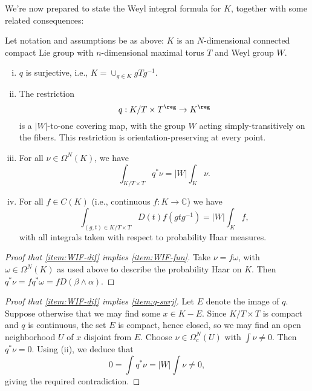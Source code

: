 \documentclass[reqno]{amsart} 
\begin{document}
We're now prepared to state the Weyl integral formula for $K$, together with some related consequences:
\begin{theorem}\label{thm:WIF-general}
  Let notation and assumptions be as above: $K$ is an $N$-dimensional connected compact Lie group with $n$-dimensional maximal torus $T$ and Weyl group $W$.
  \begin{enumerate}
[(i)]
  \item\label{item:q-surj} $q$ is surjective, i.e., $K = \cup_{g \in K} g T g^{-1}$.
  \item\label{item:q-cover} The restriction
    \begin{equation*}
      q : K/T \times T^{\reg} \rightarrow K^{\reg}
    \end{equation*}
    is a $|W|$-to-one covering map, with the group $W$ acting simply-transitively on the fibers.  This restriction is orientation-preserving at every point.
  \item\label{item:WIF-dif} For all $\nu \in \Omega^N(K)$, we have
    \begin{equation}\label{eq:WIF-dif}
      \int_{K /T \times T}
      q^* \nu = |W| \int_K \nu.
    \end{equation}
  \item\label{item:WIF-fun} For all $f \in C(K)$ (i.e., continuous $f : K \rightarrow \mathbb{C}$) we have
    \begin{equation*}
      \int_{(g,t) \in K/T \times T} D(t) f(g t g^{-1}) = |W| \int_K f,
    \end{equation*}
    with all integrals taken with respect to probability Haar measures.
  \end{enumerate}
\end{theorem}
\begin{proof}
[Proof that \ref{item:WIF-dif} implies \ref{item:WIF-fun}]
  Take $\nu = f \omega$, with $\omega \in \Omega^N(K)$ as used above to describe the probability Haar on $K$.  Then $q^* \nu = f q^* \omega = f D (\beta \wedge \alpha)$.
\end{proof}
\begin{proof}
[Proof that \ref{item:WIF-dif} implies \ref{item:q-surj}]
  Let $E$ denote the image of $q$.  Suppose otherwise that we may find some $x \in K - E$.  Since $K/T \times T$ is compact and $q$ is continuous, the set $E$ is compact, hence closed, so we may find an open neighborhood $U$ of $x$ disjoint from $E$.  Choose $\nu \in \Omega_c^N(U)$ with $\int \nu \neq 0$.  Then $q^* \nu = 0$.  Using (ii), we deduce that
  \begin{equation*}
    0 = \int q^* \nu = |W| \int \nu \neq 0,
  \end{equation*}
  giving the required contradiction.
\end{proof}
\end{document}
